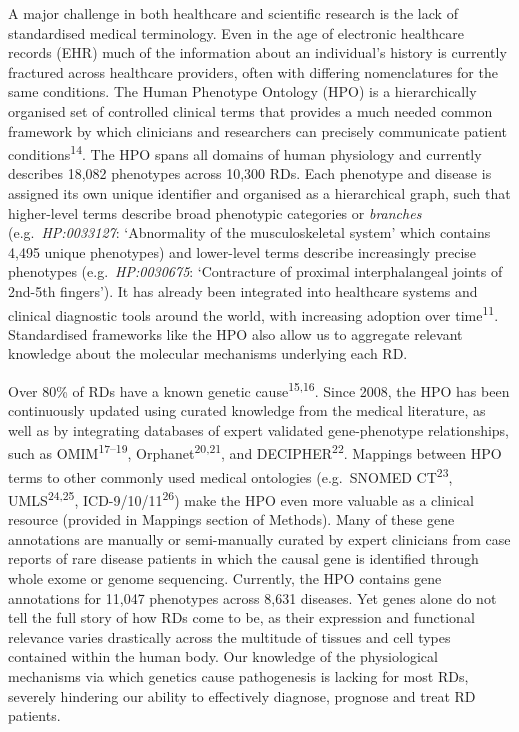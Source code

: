 \documentclass[
]{article}
\begin{document}
A major challenge in both healthcare and scientific research is the lack
of standardised medical terminology. Even in the age of electronic
healthcare records (EHR) much of the information about an individual's
history is currently fractured across healthcare providers, often with
differing nomenclatures for the same conditions. The Human Phenotype
Ontology (HPO) is a hierarchically organised set of controlled clinical
terms that provides a much needed common framework by which clinicians
and researchers can precisely communicate patient
conditions\textsuperscript{14}. The HPO spans all domains of human
physiology and currently describes 18,082 phenotypes across 10,300 RDs.
Each phenotype and disease is assigned its own unique identifier and
organised as a hierarchical graph, such that higher-level terms describe
broad phenotypic categories or \emph{branches} (e.g.~\emph{HP:0033127}:
`Abnormality of the musculoskeletal system' which contains 4,495 unique
phenotypes) and lower-level terms describe increasingly precise
phenotypes (e.g.~\emph{HP:0030675}: `Contracture of proximal
interphalangeal joints of 2nd-5th fingers'). It has already been
integrated into healthcare systems and clinical diagnostic tools around
the world, with increasing adoption over time\textsuperscript{11}.
Standardised frameworks like the HPO also allow us to aggregate relevant
knowledge about the molecular mechanisms underlying each RD.

Over 80\% of RDs have a known genetic cause\textsuperscript{15,16}.
Since 2008, the HPO has been continuously updated using curated
knowledge from the medical literature, as well as by integrating
databases of expert validated gene-phenotype relationships, such as
OMIM\textsuperscript{17--19}, Orphanet\textsuperscript{20,21}, and
DECIPHER\textsuperscript{22}. Mappings between HPO terms to other
commonly used medical ontologies (e.g.~SNOMED CT\textsuperscript{23},
UMLS\textsuperscript{24,25}, ICD-9/10/11\textsuperscript{26}) make the
HPO even more valuable as a clinical resource (provided in Mappings
section of Methods). Many of these gene annotations are manually or
semi-manually curated by expert clinicians from case reports of rare
disease patients in which the causal gene is identified through whole
exome or genome sequencing. Currently, the HPO contains gene annotations
for 11,047 phenotypes across 8,631 diseases. Yet genes alone do not tell
the full story of how RDs come to be, as their expression and functional
relevance varies drastically across the multitude of tissues and cell
types contained within the human body. Our knowledge of the
physiological mechanisms via which genetics cause pathogenesis is
lacking for most RDs, severely hindering our ability to effectively
diagnose, prognose and treat RD patients.
\end{document}
